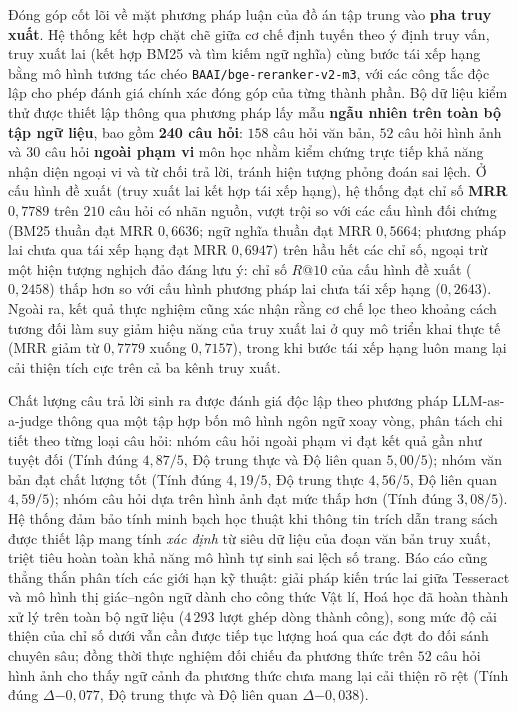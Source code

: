 Đóng góp cốt lõi về mặt phương pháp luận của đồ án tập trung vào \textbf{pha truy xuất}. Hệ thống kết hợp chặt chẽ giữa cơ chế định tuyến theo ý định truy vấn, truy xuất lai (kết hợp BM25 và tìm kiếm ngữ nghĩa) cùng bước tái xếp hạng bằng mô hình tương tác chéo \texttt{BAAI/bge-reranker-v2-m3}, với các công tắc độc lập cho phép đánh giá chính xác đóng góp của từng thành phần. Bộ dữ liệu kiểm thử được thiết lập thông qua phương pháp lấy mẫu \textbf{ngẫu nhiên trên toàn bộ tập ngữ liệu}, bao gồm \textbf{240 câu hỏi}: $158$ câu hỏi văn bản, $52$ câu hỏi hình ảnh và $30$ câu hỏi \textbf{ngoài phạm vi} môn học nhằm kiểm chứng trực tiếp khả năng nhận diện ngoại vi và từ chối trả lời, tránh hiện tượng phỏng đoán sai lệch. Ở cấu hình đề xuất (truy xuất lai kết hợp tái xếp hạng), hệ thống đạt chỉ số \textbf{MRR $0{,}7789$} trên $210$ câu hỏi có nhãn nguồn, vượt trội so với các cấu hình đối chứng (BM25 thuần đạt MRR $0{,}6636$; ngữ nghĩa thuần đạt MRR $0{,}5664$; phương pháp lai chưa qua tái xếp hạng đạt MRR $0{,}6947$) trên hầu hết các chỉ số, ngoại trừ một hiện tượng nghịch đảo đáng lưu ý: chỉ số $R@10$ của cấu hình đề xuất ($0{,}2458$) thấp hơn so với cấu hình phương pháp lai chưa tái xếp hạng ($0{,}2643$). Ngoài ra, kết quả thực nghiệm cũng xác nhận rằng cơ chế lọc theo khoảng cách tương đối làm suy giảm hiệu năng của truy xuất lai ở quy mô triển khai thực tế (MRR giảm từ $0{,}7779$ xuống $0{,}7157$), trong khi bước tái xếp hạng luôn mang lại cải thiện tích cực trên cả ba kênh truy xuất.

Chất lượng câu trả lời sinh ra được đánh giá độc lập theo phương pháp LLM-as-a-judge \cite{zheng2023llmjudge} thông qua một tập hợp bốn mô hình ngôn ngữ xoay vòng, phân tách chi tiết theo từng loại câu hỏi: nhóm câu hỏi ngoài phạm vi đạt kết quả gần như tuyệt đối (Tính đúng $4{,}87/5$, Độ trung thực và Độ liên quan $5{,}00/5$); nhóm văn bản đạt chất lượng tốt (Tính đúng $4{,}19/5$, Độ trung thực $4{,}56/5$, Độ liên quan $4{,}59/5$); nhóm câu hỏi dựa trên hình ảnh đạt mức thấp hơn (Tính đúng $3{,}08/5$). Hệ thống đảm bảo tính minh bạch học thuật khi thông tin trích dẫn trang sách được thiết lập mang tính \textit{xác định} từ siêu dữ liệu của đoạn văn bản truy xuất, triệt tiêu hoàn toàn khả năng mô hình tự sinh sai lệch số trang. Báo cáo cũng thẳng thắn phân tích các giới hạn kỹ thuật: giải pháp kiến trúc lai giữa Tesseract và mô hình thị giác--ngôn ngữ dành cho công thức Vật lí, Hoá học đã hoàn thành xử lý trên toàn bộ ngữ liệu ($4\,293$ lượt ghép dòng thành công), song mức độ cải thiện của chỉ số dưới vẫn cần được tiếp tục lượng hoá qua các đợt đo đối sánh chuyên sâu; đồng thời thực nghiệm đối chiếu đa phương thức trên $52$ câu hỏi hình ảnh cho thấy ngữ cảnh đa phương thức chưa mang lại cải thiện rõ rệt (Tính đúng $\Delta{-0{,}077}$, Độ trung thực và Độ liên quan $\Delta{-0{,}038}$).

